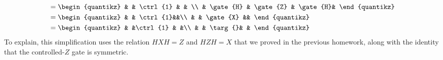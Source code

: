 \documentclass[10pt]{article}
\begin{document}
\begin{enumerate}[label=\alph*)]
\begin{solution}
\begin{align*}
					&=
					\begin{quantikz}
						& & \ctrl{1} & & \\
						& \gate{H} & \gate{Z} & \gate{H}&
					\end{quantikz}\\
					&=
					\begin{quantikz}
						& & \ctrl{1}&&\\
						& & \gate{X} && 
					\end{quantikz}\\
					&= 
					\begin{quantikz}
						& &\ctrl{1} & &\\
						& & \targ{}& &
					\end{quantikz}
				\end{align*}
				To explain, this simplification uses the relation \( HXH = Z \) and 
				\( HZH = X \) that we proved in the previous   
				homework, along with the identity that the controlled-\( Z \) gate is symmetric.
			\end{solution}
	 \end{enumerate}
	 \pagebreak
\end{document}
